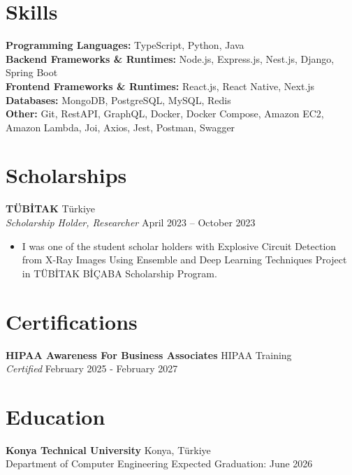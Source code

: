 \documentclass[10pt,a4paper]{extarticle}
\begin{document}
\section{Skills}
\textbf{Programming Languages:} TypeScript, Python, Java\\
\textbf{Backend Frameworks \& Runtimes:} Node.js, Express.js, Nest.js, Django, Spring Boot\\
\textbf{Frontend Frameworks \& Runtimes:} React.js, React Native, Next.js\\
\textbf{Databases:} MongoDB, PostgreSQL, MySQL, Redis\\
\textbf{Other:} Git, RestAPI, GraphQL, Docker, Docker Compose, Amazon EC2, Amazon Lambda, Joi, Axios, Jest, Postman, Swagger
\section{Scholarships}
\textbf{TÜBİTAK} \hfill Türkiye\\
\textit{Scholarship Holder, Researcher} \hfill April 2023 -- October 2023
\begin{itemize}[leftmargin=*,noitemsep,topsep=0pt]
    \item I was one of the student scholar holders with Explosive Circuit Detection from X-Ray Images Using Ensemble and Deep Learning Techniques Project in TÜBİTAK BİÇABA Scholarship Program.
\end{itemize}
\section{Certifications}
\textbf{HIPAA Awareness For Business Associates} \hfill HIPAA Training\\
\textit{Certified} \hfill February 2025 - February 2027
\section{Education}
\textbf{Konya Technical University} \hfill Konya, Türkiye\\
Department of Computer Engineering \hfill Expected Graduation: June 2026
\end{document}
